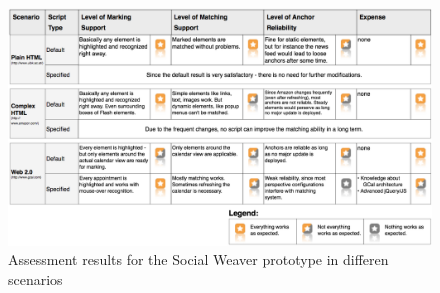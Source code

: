 \begin{figure}\centering
		\includegraphics[height=0.7\textwidth, angle=90]{images/assessments-results.png}
		\caption{Assessment results for the Social Weaver prototype in differen scenarios}
		\label{assessments-results}
\end{figure} 

